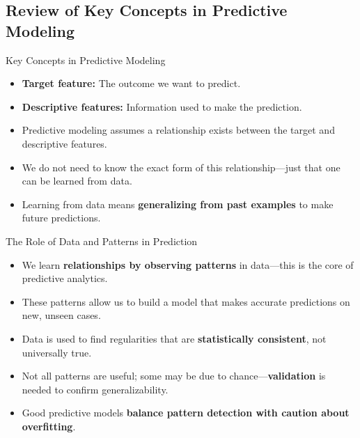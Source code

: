 \documentclass[aspectratio=169,xcolor=dvipsnames]{beamer}
\begin{document}
\subsection{Review of Key Concepts in Predictive Modeling}
\begin{frame}{Key Concepts in Predictive Modeling}

\begin{itemize}
  \item \textbf{Target feature:} The outcome we want to predict.
  \item \textbf{Descriptive features:} Information used to make the prediction.
  \item Predictive modeling assumes a relationship exists between the target and descriptive features.
  \item We do not need to know the exact form of this relationship—just that one can be learned from data.
  \item Learning from data means \textbf{generalizing from past examples} to make future predictions.
\end{itemize}

\end{frame}

\begin{frame}{The Role of Data and Patterns in Prediction}

\begin{itemize}
  \item We learn \textbf{relationships by observing patterns} in data—this is the core of predictive analytics.
  \item These patterns allow us to build a model that makes accurate predictions on new, unseen cases.
  \item Data is used to find regularities that are \textbf{statistically consistent}, not universally true.
  \item Not all patterns are useful; some may be due to chance—\textbf{validation} is needed to confirm generalizability.
  \item Good predictive models \textbf{balance pattern detection with caution about overfitting}.
\end{itemize}

\end{frame}
\end{document}
